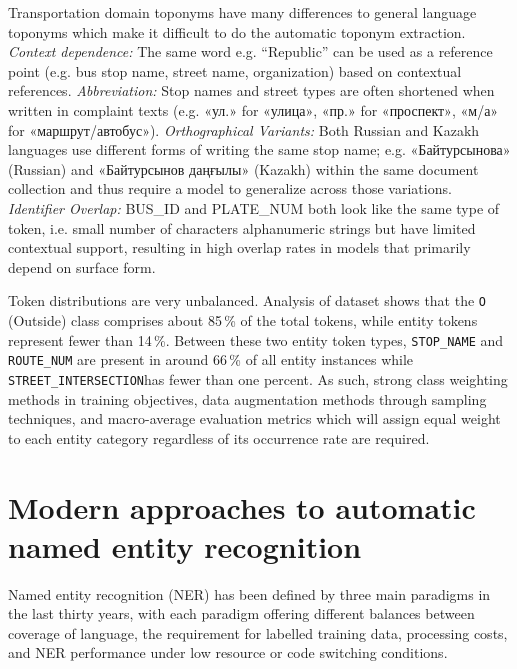 Transportation domain toponyms have many differences to general language toponyms which make it difficult to do the automatic toponym extraction. 
\textit{Context dependence:} The same word e.g. “Republic” can be used as a reference point (e.g. bus stop name, street name, organization) based on contextual references. 
\textit{Abbreviation:} Stop names and street types are often shortened when written in complaint texts (e.g. \foreignlanguage{russian}{«ул.»} for \foreignlanguage{russian}{«улица»}, \foreignlanguage{russian}{«пр.»} for \foreignlanguage{russian}{«проспект»}, \foreignlanguage{russian}{«м/а»} for \foreignlanguage{russian}{«маршрут/автобус»}). 
\textit{ Orthographical Variants:} Both Russian and Kazakh languages use different forms of writing the same stop name; e.g. \foreignlanguage{russian}{«Байтурсынова»} (Russian) and \foreignlanguage{russian}{«Байтурсынов даңғылы»} (Kazakh) within the same document collection and thus require a model to generalize across those variations. 
\textit{Identifier Overlap:} BUS\_ID and PLATE\_NUM both look like the same type of token, i.e. small number of characters alphanumeric strings but have limited contextual support, resulting in high overlap rates in models that primarily depend on surface form.


Token distributions are very unbalanced. Analysis of dataset shows that the \texttt{O} (Outside) class comprises about 85\,\% of the total tokens, while entity tokens represent fewer than 14\,\%. Between these two entity token types, \texttt{STOP\_NAME} and \texttt{ROUTE\_NUM} are present in around 66\,\% of all entity instances while \texttt{STREET\_INTERSECTION}has fewer than one percent. As such, strong class weighting methods in training objectives, data augmentation methods through sampling techniques, and macro-average evaluation metrics which will assign equal weight to each entity category regardless of its occurrence rate are required. 



\section{Modern approaches to automatic named entity recognition}
\label{sec:modern_approaches}

Named entity recognition (NER) has been defined by three main paradigms in the last thirty years, with each paradigm offering different balances between coverage of language, the requirement for labelled training data, processing costs, and NER performance under low resource or code switching conditions.


